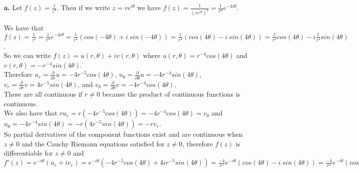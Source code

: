 \documentclass{article}
\begin{document}
{\Large\textbf{a.}} Let $f(z) =\frac{1}{z^4}$. Then if we write $z = r e^{i\theta}$ we have $f(z) =\frac{1}{(r e^{i\theta})^4} =\frac{1}{r^4} e^{-4i\theta}$.
\begin{center}
    \doublespacing
    We have that $f(z) =\frac{1}{z^4} =\frac{1}{r^4} e^{-4i\theta} =\frac{1}{r^4} (cos(-4\theta) + i\:sin(-4\theta)) =\frac{1}{r^4} (cos(4\theta) - i\:sin(4\theta)) =\frac{1}{r^4} cos(4\theta) - i\frac{1}{r^4} sin(4\theta)$.
    \\So we can write $f(z) = u(r,\theta) + iv(r,\theta)$ where $u(r,\theta) = r^{-4} cos(4\theta)$ and $v(r,\theta) = -r^{-4} sin(4\theta)$.
    \break
    \\Therefore $u_r =\frac{\partial}{\partial r} u = -4 r^{-5} cos(4\theta)$, $u_\theta =\frac{\partial}{\partial\theta} u = -4 r^{-4} sin(4\theta)$, $v_r =\frac{\partial}{\partial r} v = 4 r^{-5} sin(4\theta)$, and $v_\theta =\frac{\partial}{\partial\theta} v = -4 r^{-4} cos(4\theta)$.
    \\These are all continuous if $r\neq 0$ because the product of continuous functions is continuous.
    \\We also have that $r u_r = r(-4 r^{-5} cos(4\theta)) = -4 r^{-4} cos(4\theta) = v_\theta$ and $u_\theta = -4 r^{-4} sin(4\theta) = -r(4 r^{-5} sin(4\theta)) = -r v_r$.
    \break
    \\So partial derivatives of the component functions exist and are continuous when $z\neq 0$ and the Cauchy Riemann equations satisfied for $z\neq 0$, therefore $f(z)$ is differentiable for $z\neq 0$ and $f'(z) = e^{-i\theta} (u_r + iv_r) = e^{-i\theta} (-4 r^{-5} cos(4\theta) + 4i r^{-5} sin(4\theta)) =\frac{-4}{r^5} e^{-i\theta} (cos(4\theta) - i\:sin(4\theta)) =\frac{-4}{r^5} e^{-i\theta} (cos(-4\theta) + i\:sin(-4\theta)) =\frac{-4}{r^5} e^{-i\theta} e^{-4i\theta} =\frac{-4}{r^5 e^{5i\theta}} =\frac{-4}{(re^{i\theta})^5} =\frac{-4}{z^5}$ \qedsymbol
\end{center}
\end{document}
